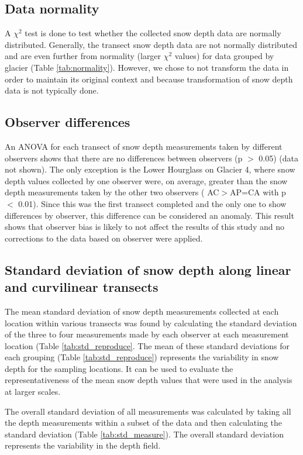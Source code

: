 \documentclass{sfuthesis}
\begin{document}
\begin{appendices}
\subsection{Data normality}

A $\chi^2$ test is done to test whether the collected snow depth data are normally distributed. Generally, the transect snow depth data are not normally distributed and are even further from normality (larger $\chi^2$ values) for data grouped by glacier (Table \ref{tab:normality}). However, we chose to not transform the data in order to maintain its original context and because transformation of snow depth data is not typically done.  

\subsection{Observer differences}

An ANOVA for each transect of snow depth measurements taken by different observers shows that there are no differences between observers (p $>$ 0.05) (data not shown). The only exception is the Lower Hourglass on Glacier 4, where snow depth values collected by one observer were, on average, greater than the snow depth measurements taken by the other two observers ( AC$>$AP=CA with p $<$ 0.01). Since this was the first transect completed and the only one to show differences by observer, this difference can be considered an anomaly. This result shows that observer bias is likely to not affect the results of this study and no corrections to the data based on observer were applied.

\subsection{Standard deviation of snow depth along linear and curvilinear transects}
\label{sec:stdTransects}

The mean standard deviation of snow depth measurements collected at each location within various transects was found by calculating the standard deviation of the three to four measurements made by each observer at each measurement location (Table \ref{tab:std_reproduce}. The mean of these standard deviations for each grouping (Table \ref{tab:std_reproduce}) represents the variability in snow depth for the sampling locations. It can be used to evaluate the representativeness of the mean snow depth values that were used in the analysis at larger scales.

The overall standard deviation of all measurements was calculated by taking all the depth measurements within a subset of the data and then calculating the standard deviation (Table \ref{tab:std_measure}). The overall standard deviation represents the variability in the depth field. 


\end{appendices}
\end{document}
